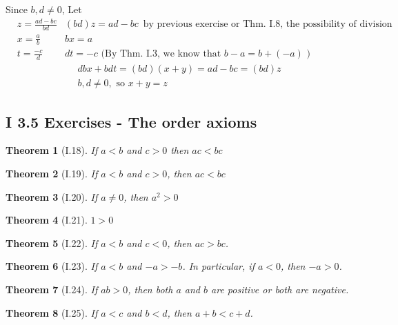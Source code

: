 \documentclass[twoside]{amsart}
\theoremstyle{plain}
\newtheorem{theorem}{Theorem}
\theoremstyle{definition}
\newcommand{\exercisehead}[1]
  {\smallskip
   \noindent{\small\bf Exercise #1.}}
\begin{document}
\exercisehead{10} Since $b,d \neq 0$, 
Let 
\[
\begin{aligned} 
  & z = \frac{ ad -bc}{bd}  & (bd)z = ad - bc \, \text{ by previous exercise or Thm. I.8, the possibility of division } \\
  & x = \frac{a}{b}  & bx = a \\
  & t = \frac{-c}{d} & dt = -c \text{ (By Thm. I.3, we know that $b-a = b + (-a)$ ) }
\end{aligned}
\]
\[
\begin{gathered}
  dbx + bdt = (bd) (x+y) = ad-bc =(bd)z   \\
  b,d \neq 0, \text{ so } x+ y = z
\end{gathered}
\]

\subsection*{ I 3.5 Exercises - The order axioms }

\begin{theorem}[I.18] If $a<b$ and $c>0$ then $ac<bc$ \end{theorem}
\begin{theorem}[I.19] If $a<b$ and $c>0$, then $ac<bc$ \end{theorem}
\begin{theorem}[I.20] If $a\neq 0$, then $a^2>0$ \end{theorem}
\begin{theorem}[I.21] $1>0$ \end{theorem}
\begin{theorem}[I.22] If $a<b$ and $c<0$, then $ac > bc$.  \end{theorem}
\begin{theorem}[I.23] If $a<b$ and $-a > -b$.  In particular, if $a<0$, then $-a >0$.   \end{theorem}
\begin{theorem}[I.24] If $ab>0$, then both $a$ and $b$ are positive or both are negative.  \end{theorem}
\begin{theorem}[I.25] If $a<c$ and $b<d$, then $a+b<c+d$.  \end{theorem}
\end{document}
